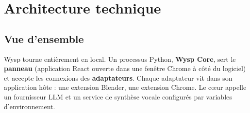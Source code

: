 \section{Architecture technique}

\subsection{Vue d'ensemble}

Wysp tourne entièrement en local. Un processus Python, \textbf{Wysp Core}, sert le \textbf{panneau} (application React ouverte dans une fenêtre Chrome à côté du logiciel) et accepte les connexions des \textbf{adaptateurs}. Chaque adaptateur vit dans son application hôte : une extension Blender, une extension Chrome. Le cœur appelle un fournisseur LLM et un service de synthèse vocale configurés par variables d'environnement.

